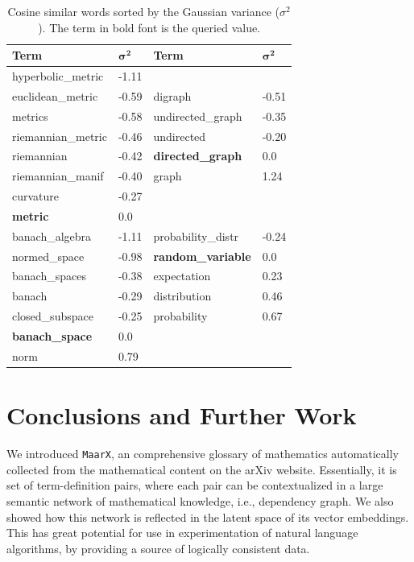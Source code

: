 \documentclass[11pt,a4paper]{article}
\begin{document}
\begin{table}
    \small
\centering
\begin{tabular}{ll|ll}
    \hline \textbf{Term} &  $\mathbf{\sigma^2}$ &  
    \textbf{Term} &  $\mathbf{\sigma^2}$ \\ \hline
    hyperbolic\_metric & -1.11 &  &\\
euclidean\_metric & -0.59  & digraph & -0.51 \\
metrics & -0.58 & undirected\_graph & -0.35 \\
riemannian\_metric & -0.46  &  undirected & -0.20 \\
riemannian & -0.42  & \textbf{directed\_graph} &  0.0\\
riemannian\_manif & -0.40 & graph & 1.24 \\
curvature & -0.27  & & \\
\textbf{metric} & 0.0 & & \\
\hline
banach\_algebra & -1.11  & probability\_distr & -0.24 \\
normed\_space & -0.98 & \textbf{random\_variable} & 0.0 \\
banach\_spaces & -0.38 & expectation & 0.23 \\
banach & -0.29  & distribution & 0.46 \\
closed\_subspace & -0.25 & probability & 0.67 \\
\textbf{banach\_space} & 0.0 & & \\
norm & 0.79 & & \\

\end{tabular}
\caption{\label{tab:hypernyny} Cosine similar words sorted by the
    Gaussian variance ($\sigma^2$). The term in bold font is the
queried value.}
\end{table}


\section{Conclusions and Further Work}
We introduced \texttt{MaarX}, an comprehensive glossary of mathematics
automatically collected from the mathematical content on the arXiv website. 
Essentially, it is set of term-definition pairs, where 
each pair can be contextualized in a large semantic network of
mathematical knowledge, i.e., dependency graph. We also showed how this 
network is reflected in the latent space of its vector embeddings. This
has great potential for use in experimentation of natural language
algorithms, by providing a source of logically consistent data. 
\end{document}
